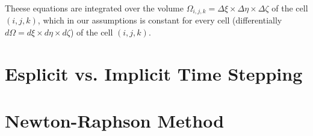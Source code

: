 Theese equations are integrated over the volume $\Omega_{i, j, k} = \Delta \xi \times \Delta \eta \times \Delta \zeta $ of the cell $(i, j, k)$, which in our assumptions is constant for every cell (differentially $d \Omega = d \xi \times d \eta \times d \zeta$) of the cell $(i, j, k)$.
\section{Esplicit vs. Implicit Time Stepping}


\section{Newton-Raphson Method}


